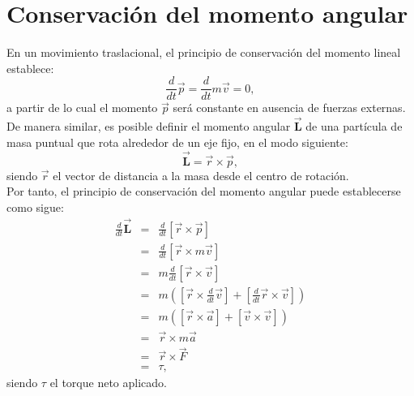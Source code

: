 \section*{Conservación del momento angular}
\noindent En un movimiento traslacional, el principio de conservación del momento lineal establece:
\begin{equation}
\frac{d}{dt}\vec{p} = \frac{d}{dt}{m\vec{v}} = 0,
\end{equation}
a partir de lo cual el momento $\vec{p}$ será constante en ausencia de fuerzas externas.\\

De manera similar, es posible definir el momento angular $\vec{\mathbf{L}}$ de una partícula de masa puntual que rota alrededor de un eje fijo, en el modo siguiente:
\begin{equation}\label{momang}
\vec{\mathbf{L}} = \vec{r} \times \vec{p},
\end{equation}
siendo $\vec{r}$ el vector de distancia a la masa desde el centro de rotación.\\

Por tanto, el principio de conservación del momento angular puede establecerse como sigue:
\begin{eqnarray*}
\frac{d}{dt}\vec{\mathbf{L}} & = & \frac{d}{dt}{[\vec{r} \times \vec{p}]} \\
                             & = & \frac{d}{dt}{[\vec{r} \times m\vec{v}]}\\
                             & = & m \frac{d}{dt}{[\vec{r} \times \vec{v}]}\\
                             & = & m\left([\vec{r}\times\frac{d}{dt}\vec{v}]+[\frac{d}{dt}\vec{r}\times\vec{v}]\right)\\
                             & = & m\left([\vec{r}\times \vec{a}]+[\vec{v}\times\vec{v}]\right)\\
                             & = & \vec{r}\times m\vec{a}\\
                             & = & \vec{r}\times \vec{F}\\
                             & = & \tau,
\end{eqnarray*}
siendo $\tau$ el torque neto aplicado.\\

